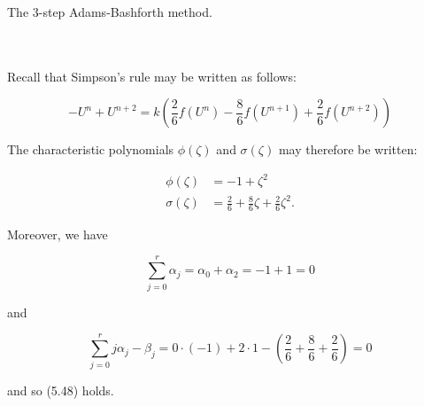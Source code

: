 The 3-step Adams-Bashforth method.

\begin{solution}\ \\\\
    Recall that Simpson's rule may be written as follows:

    $$
    -U^{n} + U^{n+2} = k \left(\frac{2}{6} f(U^n) - \frac{8}{6} f(U^{n+1}) + \frac{2}{6} f(U^{n+2}) \right)
    $$

    The characteristic polynomials $\phi(\zeta)$ and $\sigma(\zeta)$ may therefore be written:

    \begin{align*}
        \phi(\zeta)   &= -1 + \zeta^2 \\
        \sigma(\zeta) &= \frac{2}{6} + \frac{8}{6} \zeta + \frac{2}{6} \zeta^2.
    \end{align*}

    Moreover, we have 
    
    $$
    \sum\limits_{j=0}^{r}{\alpha_j = \alpha_0 + \alpha_2} = -1 + 1 = 0
    $$

    and 
    
    $$
    \sum\limits_{j=0}^{r}{j \alpha_j - \beta_j} = 0 \cdot (-1) + 2 \cdot 1 - \left(\frac{2}{6} + \frac{8}{6} + \frac{2}{6} \right) = 0
    $$

    and so (5.48) holds.

    \ \\
\end{solution}